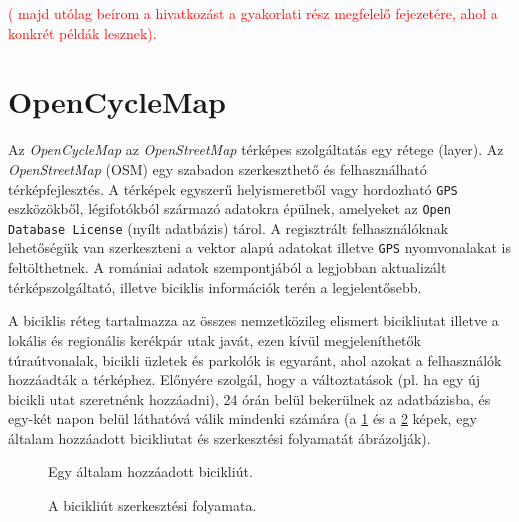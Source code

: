 \textcolor{red}{ ( majd utólag beírom a hivatkozást a gyakorlati rész megfelelő fejezetére, ahol a konkrét példák lesznek).}
%
\section{OpenCycleMap}\label{sec:FELH:ocm}

Az \textit{OpenCycleMap} az \textit{OpenStreetMap} térképes szolgáltatás egy rétege (layer). Az \textit{OpenStreetMap} (OSM) egy szabadon szerkeszthető és felhasználható térképfejlesztés. A térképek egyszerű helyismeretből vagy hordozható {\tt GPS } eszközökből, légifotókból származó adatokra épülnek, amelyeket az {\tt Open Database License} (nyílt adatbázis) tárol. A regisztrált felhasználóknak lehetőségük van szerkeszteni a vektor alapú adatokat illetve {\tt GPS} nyomvonalakat is feltölthetnek. A romániai adatok szempontjából a legjobban aktualizált térképszolgáltató, illetve biciklis információk terén a legjelentősebb.
\par 	A biciklis réteg tartalmazza az összes nemzetközileg elismert bicikliutat illetve a lokális és regionális kerékpár utak javát, ezen kívül megjeleníthetők túraútvonalak, bicikli üzletek és parkolók is egyaránt, ahol azokat a felhasználók hozzáadták a térképhez. Előnyére szolgál, hogy a változtatások (pl. ha egy új bicikli utat szeretnénk hozzáadni), 24 órán belül bekerülnek az adatbázisba, és egy-két napon belül  láthatóvá válik mindenki számára (a \ref{fig:FELH:kep1} és a \ref{fig:FELH:kep2} képek, egy általam hozzáadott bicikliutat és szerkesztési folyamatát ábrázolják).


\begin{figure}[ht]
  \centering
  \caption[Egy általam hozzáadott bicikliút]%
  {Egy általam hozzáadott bicikliút.}
  \label{fig:FELH:kep1}
\end{figure}


\begin{figure}[ht]
  \centering
  \caption[A bicikliút szerkesztési folyamata]%
  {A bicikliút szerkesztési folyamata.}
  \label{fig:FELH:kep2}
\end{figure}


%